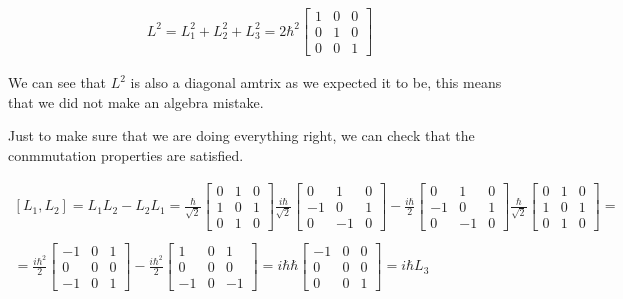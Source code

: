 \begin{equation}
\begin{array}{c}
    \\
    L^2 = L_1^2 + L_2^2 + L_3^2 = 2\hbar^2
    \left[\begin{matrix}
      1 & 0 & 0\\
      0 & 1 & 0\\
      0 & 0 & 1
    \end{matrix}\right]
  \end{array}
\end{equation}

We can see that $L^2$ is also a diagonal amtrix as we expected it to be, this means that we did not make an algebra mistake.

Just to make sure that we are doing everything right, we can check that the conmmutation properties are satisfied.

\begin{equation}
  \begin{array}{c}
    [L_1,L_2] = L_1L_2-L_2L_1 =
    \frac{\hbar}{\sqrt{2}}
    \left[\begin{matrix}
      0 & 1 & 0\\
      1 & 0 & 1\\
      0 & 1 & 0
    \end{matrix}\right]
    \frac{i\hbar}{\sqrt{2}}
    \left[\begin{matrix}
      0 & 1 & 0\\
      -1 & 0 & 1\\
      0 & -1 & 0
    \end{matrix}\right] -
    \frac{i\hbar}{2}
    \left[\begin{matrix}
      0 & 1 & 0\\
      -1 & 0 & 1\\
      0 & -1 & 0
    \end{matrix}\right]
    \frac{\hbar}{\sqrt{2}}
    \left[\begin{matrix}
      0 & 1 & 0\\
      1 & 0 & 1\\
      0 & 1 & 0
    \end{matrix}\right] =
    \\

    \\
    =
    \frac{i\hbar^2}{2}
    \left[\begin{matrix}
      -1 & 0 & 1\\
      0 & 0 & 0\\
      -1 & 0 & 1
    \end{matrix}\right]-
    \frac{i\hbar^2}{2}
    \left[
    \begin{matrix}
      1 & 0 & 1\\
      0 & 0 & 0\\
      -1 & 0 & -1
    \end{matrix}
    \right] = i \hbar \hbar\left[\begin{matrix}
      -1 & 0 & 0\\
      0 & 0 & 0\\
      0 & 0 & 1
    \end{matrix}\right] = i \hbar L_3
  \end{array}
\end{equation}

